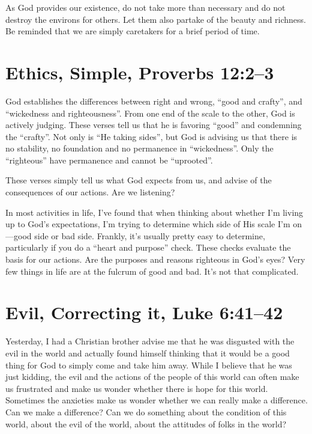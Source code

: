 \documentclass[12pt]{memoir}
\begin{document}
As God provides our existence, do not take more than necessary and
do not destroy the environs for others. Let them also partake of the
beauty and richness. Be reminded that we are simply caretakers for
a brief period of time.

\section[Ethics, Simple]{Ethics, Simple, Proverbs 12:2--3}

God establishes the differences between right and wrong, ``good and
crafty'', and ``wickedness and righteousness''. From one end of
the scale to the other, God is actively judging. These verses tell
us that he is favoring ``good'' and condemning the ``crafty''.
Not only is ``He taking sides'', but God is advising us that there
is no stability, no foundation and no permanence in ``wickedness''.
Only the ``righteous'' have permanence and cannot be ``uprooted''.

These verses simply tell us what God expects from us, and advise of
the consequences of our actions. Are we listening?

In most activities in life, I've found that when thinking about whether
I'm living up to God's expectations, I'm trying to determine which
side of His scale I'm on---good side or bad side. Frankly, it's usually
pretty easy to determine, particularly if you do a ``heart and purpose''
check. These checks evaluate the basis for our actions. Are the purposes
and reasons righteous in God's eyes? Very few things in life are at
the fulcrum of good and bad. It's not that complicated.

\section[Evil, Correcting It]{Evil, Correcting it, Luke 6:41--42}

Yesterday, I had a Christian brother advise me that he was disgusted
with the evil in the world and actually found himself thinking that
it would be a good thing for God to simply come and take him away.
While I believe that he was just kidding, the evil and the actions
of the people of this world can often make us frustrated and make
us wonder whether there is hope for this world. Sometimes the anxieties
make us wonder whether we can really make a difference. Can we make
a difference? Can we do something about the condition of this world,
about the evil of the world, about the attitudes of folks in the world?
\end{document}
